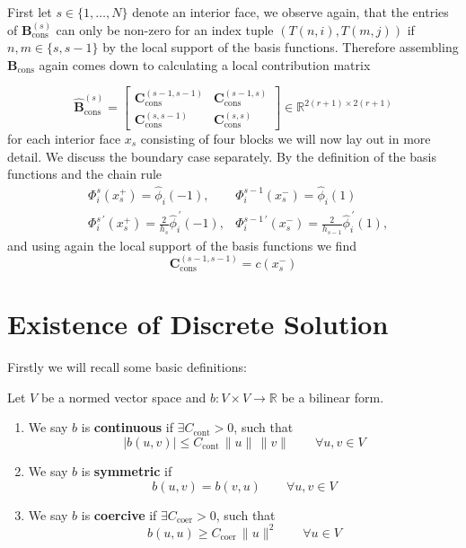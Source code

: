 First let $s \in \{1,\ldots,N\}$ denote an interior face, we observe again, that the entries of 
$\textbf{B}_{\text{cons}}^{(s)}$ can only be non-zero for an index tuple $(T(n,i),T(m,j))$ if 
$n,m \in \{s, s-1\}$ by the local support of the basis functions.
Therefore assembling $ \textbf{B}_{\text{cons}}$ again comes down to calculating a local contribution matrix 

\begin{equation*}
    \widehat{\textbf{B}}_{\text{cons}}^{(s)} = 
    \begin{bmatrix}
        \textbf{C}_{\text{cons}}^{(s-1,s-1)} & \textbf{C}_{\text{cons}}^{(s-1,s)} \\
        \textbf{C}_{\text{cons}}^{(s,s-1)} & \textbf{C}_{\text{cons}}^{(s,s)} 
    \end{bmatrix}
    \in \mathbb{R}^{2(r+1) \times 2(r+1)}
\end{equation*}
for each interior face $x_s$ consisting of four blocks we will now lay out in more detail.
We discuss the boundary case separately.
By the definition of the basis functions and the chain rule 
\begin{align*}
    & \Phi_i^s(x_s^+) = \widehat{\phi}_i(-1) , & \Phi^{s-1}_i(x_s^-) = \widehat{\phi}_i(1) \\
    & \Phi_i^{s\, \prime }(x_s^+) = \frac{2}{h_{s}} \widehat{\phi}_i^{\,\prime}(-1), 
    & \Phi_i^{s-1\, \prime }(x_s^-) = \frac{2}{h_{s-1}} \widehat{\phi}_i^{\,\prime}(1), 
\end{align*}
and using again the local support of the basis functions we find
\begin{equation*}
    \textbf{C}_{\text{cons}}^{(s-1,s-1)} = c(x_s^-)
\end{equation*}

\section{Existence of Discrete Solution}
\label{sec:existence_uniqueness_elliptic_discrete_problem}
Firstly we will recall some basic definitions:
\begin{definition} Let $V$ be a normed vector space and $b:V\times V \to \mathbb{R}$
    be a bilinear form.
    \begin{enumerate}[label=\textnormal{(\roman*)}]
        \item We say $b$ is \textbf{continuous} if $\exists C_{\text{cont}}>0$, such that
        \[
            |b(u,v)|\leq C_{\text{cont}}\, \|u\|\, \|v\| \qquad \forall u,v \in V
        \]
        \item We say $b$ is \textbf{symmetric} if 
        \[  
            b(u,v) = b(v,u) \qquad \forall u,v \in V
        \]
        \item We say $b$ is \textbf{coercive} if $\exists C_{\text{coer}}>0$, such that
        \[
            b(u,u)\geq C_{\text{coer}}\, \|u\|^2 \qquad \forall u \in V
        \]
    \end{enumerate}
\end{definition}



